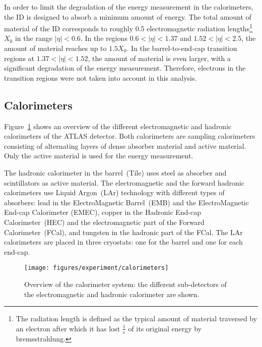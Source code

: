 In order to limit the degradation of the energy measurement in the
calorimeters, the ID is designed to absorb a minimum amount of energy.
The total amount of material of the ID corresponds to roughly 0.5
electromagnetic radiation lengths\footnote{The radiation length is
  defined as the typical amount of material traversed by an electron
  after which it has lost $\frac{1}{e}$ of its original energy by
  bremsstrahlung.} $X_0$ in the range \mbox{$|\eta| < 0.6$}.
In the regions \mbox{$0.6 < |\eta| < 1.37$} and \mbox{$1.52 < |\eta| <
  2.5$}, the amount of material reaches up to \mbox{$1.5 X_0$}.
In the barrel-to-end-cap transition regions at \mbox{$1.37 < |\eta| <
  1.52$}, the amount of material is even larger, with a significant
degradation of the energy measurement.
Therefore, electrons in the transition regions were not taken into
account in this analysis.

\subsection{Calorimeters}
\label{sec:calorimeter}

Figure~\ref{fig:calorimeters} shows an overview of the different electromagnetic 
and hadronic calorimeters of the ATLAS detector.
Both calorimeters are sampling calorimeters consisting of alternating layers
of dense absorber material and active material.
Only the active material is used for the energy measurement.

The hadronic calorimeter in the barrel~(Tile) uses steel as absorber
and scintillators as active material.
The electromagnetic and the forward hadronic calorimeters use Liquid
Argon~(LAr) technology with different types of absorbers:
lead in the ElectroMagnetic Barrel~(EMB) and the ElectroMagnetic
End-cap Calorimeter (EMEC), copper in the Hadronic End-cap
Calorimeter~(HEC) and the electromagnetic part of the Forward Calorimeter~(FCal),
and tungsten in the hadronic part of the FCal.
The LAr calorimeters are placed in three cryostats: one for the barrel and one for each end-cap.

\begin{figure}[ht]
\begin{center}
\texttt{[image: figures/experiment/calorimeters]}
\caption[Overview of the calorimeter system]{
  Overview of the calorimeter system:
  the different sub-detectors of the electromagnetic and hadronic calorimeter are shown.}
\label{fig:calorimeters}
\end{center}
\end{figure}

